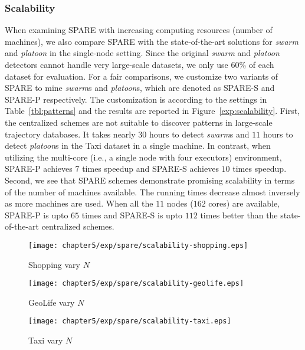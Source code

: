 \subsubsection{Scalability}
When examining SPARE with increasing computing resources (number of machines), we also compare SPARE with the state-of-the-art solutions for \emph{swarm} and \emph{platoon} in the single-node setting. Since the original \emph{swarm} and \emph{platoon} detectors cannot handle very large-scale datasets, we only use 60\% of each dataset for evaluation. For a fair comparisons, we customize two variants of SPARE to mine \emph{swarm}s and \emph{platoon}s, which are denoted as SPARE-S and SPARE-P respectively. The customization is according to the settings in Table~\ref{tbl:patterns} and the results are reported in Figure~\ref{exp:scalability}. 
First, the centralized schemes are not suitable to discover patterns in 
large-scale trajectory databases. It takes nearly $30$ hours to 
detect \emph{swarm}s and $11$ hours to detect \emph{platoon}s in the Taxi dataset in a single machine. 
In contrast, when utilizing the multi-core (i.e., a single node with four executors) environment, 
SPARE-P achieves $7$ times speedup and SPARE-S achieves $10$ times speedup. 
Second, we see that SPARE schemes demonstrate promising scalability in terms of the number of machines available. The running times decrease almost inversely as more machines are used. 
When all the $11$ nodes ($162$ cores) are available, 
SPARE-P is upto $65$ times and SPARE-S is upto $112$ times better than the state-of-the-art centralized schemes.
%
\begin{figure*}[t]
\centering
\begin{subfigure}[b]{0.3\textwidth}
    \texttt{[image: chapter5/exp/spare/scalability-shopping.eps]}
        \caption{Shopping vary $N$}
    \end{subfigure}
 	 \begin{subfigure}[b]{0.3\textwidth}
        \texttt{[image: chapter5/exp/spare/scalability-geolife.eps]}
        \caption{GeoLife vary $N$}
    \end{subfigure}
    	 \begin{subfigure}[b]{0.3\textwidth}
        \texttt{[image: chapter5/exp/spare/scalability-taxi.eps]}
        \caption{Taxi vary $N$}
    \end{subfigure}
 \caption{Comparisons among TRMP, SPARE, PLATOON and SWARM.}
 \label{exp:scalability}
\end{figure*}
